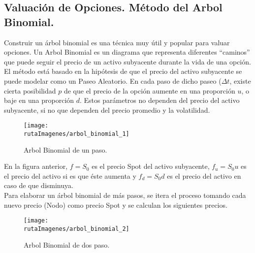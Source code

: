 \subsection{Valuación de Opciones. Método del Arbol Binomial.}

Construir un árbol binomial es una técnica muy útil y popular para valuar opciones.  Un \textcolor{principal}{Arbol Binomial} es un diagrama que representa diferentes ``caminos'' que puede seguir el precio de un activo subyacente durante la vida de una opción.\\

El método está basado en la hipótesis de que el precio del activo subyacente se puede modelar como un \textcolor{principal}{Paseo Aleatorio}. En cada paso de dicho paseo ($\Delta t$, existe cierta posibilidad $p$ de que el precio de la opción aumente en una proporción $u$, o baje en una proporción $d$. Estos parámetros no dependen del precio del activo subyacente, si no que dependen del precio promedio y la volatilidad.\\
\begin{figure}[H]
\centering
\caption{Arbol Binomial de un paso.}
\texttt{[image: \\rutaImagenes/arbol\_binomial\_1]}
\end{figure}

En la figura anterior, $f=S_0$ es el precio Spot del activo subyacente, $f_u=S_0u$ es el precio del activo si es que éste aumenta y $f_d=S_0d$ es el precio del activo en caso de que disminuya.\\

Para elaborar un árbol binomial de más pasos, se itera el proceso tomando cada nuevo precio (Nodo) como precio Spot y se calculan los siguientes precios.\\

\begin{figure}[H]
\centering
\caption{Arbol Binomial de dos paso.}
\texttt{[image: \\rutaImagenes/arbol\_binomial\_2]}
\end{figure}


